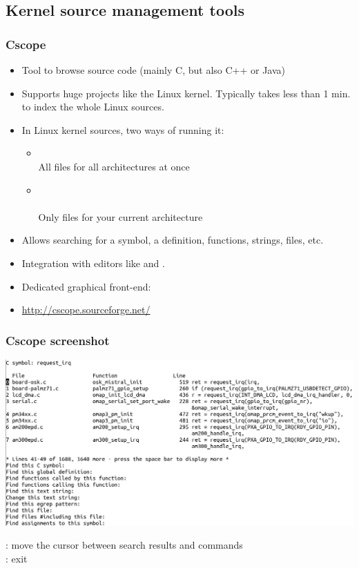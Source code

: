 \subsection{Kernel source management tools}

\begin{frame}
  \frametitle{Cscope}
  \begin{itemize}
  \item Tool to browse source code (mainly C, but also C++ or Java)
  \item Supports huge projects like the Linux kernel. Typically takes less
    than 1 min. to index the whole Linux sources.
  \item In Linux kernel sources, two ways of running it:
    \begin{itemize}
    \item {}\\
      All files for all architectures at once
    \item {}\\
      \\
      Only files for your current architecture
    \end{itemize}
  \item Allows searching for a symbol, a definition, functions,
    strings, files, etc.
  \item Integration with editors like  and .
  \item Dedicated graphical front-end: 
  \item \url{http://cscope.sourceforge.net/}
  \end{itemize}
\end{frame}

\begin{frame}
  \frametitle{Cscope screenshot}
  \begin{center}
    \includegraphics[height=0.7\textheight]{slides/kernel-source-code-management/cscope.png}
  \end{center}
  \code{[Tab]}: move the cursor between search results and commands\\
  \code{[Ctrl] [D]}: exit 
\end{frame}

